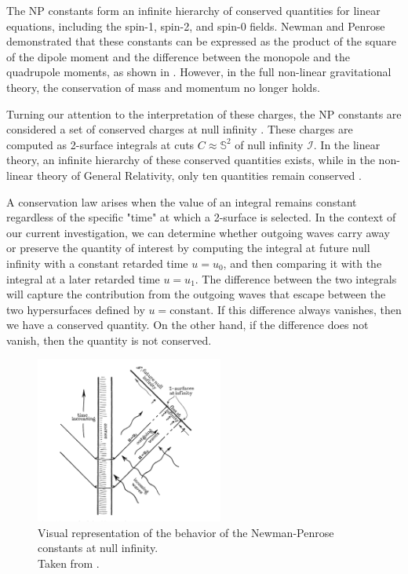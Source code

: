 The NP constants form an infinite hierarchy of conserved quantities for linear equations, including the spin-1, spin-2, and spin-0 fields. Newman and Penrose demonstrated that these constants can be expressed as the product of the square of the dipole moment and the difference between the monopole and the quadrupole moments, as shown in \cite{DaiVal02}. However, in the full non-linear gravitational theory, the conservation of mass and momentum no longer holds.

Turning our attention to the interpretation of these charges, the NP constants are considered a set of conserved charges at null infinity \cite{NewPen68}. These charges are computed as 2-surface integrals at cuts ${C} \approx \mathbb{S}^2$ of null infinity $\mathscr{I}$. In the linear theory, an infinite hierarchy of these conserved quantities exists, while in the non-linear theory of General Relativity, only ten quantities remain conserved \cite{NewPen68}.

A conservation law arises when the value of an integral remains constant regardless of the specific "time" at which a 2-surface is selected. In the context of our current investigation, we can determine whether outgoing waves carry away or preserve the quantity of interest by computing the integral at future null infinity with a constant retarded time $u = u_0$, and then comparing it with the integral at a later retarded time $u = u_1$. The difference between the two integrals will capture the contribution from the outgoing waves that escape between the two hypersurfaces defined by $u = \text{constant}$. If this difference always vanishes, then we have a conserved quantity. On the other hand, if the difference does not vanish, then the quantity is not conserved.

\begin{figure}[h]
  \centering \includegraphics[width =0.55\textwidth]{penrose constants.png}
    \caption{Visual representation of the behavior of the Newman-Penrose constants at null infinity.\\
    Taken from \cite{NewPen68}.}
\end{figure}

